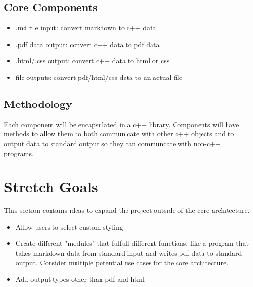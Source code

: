\documentclass[12pt]{article}
\begin{document}
	\subsection{Core Components}
		\begin{itemize}
			\item .md file input: convert markdown to c++ data
			\item .pdf data output: convert c++ data to pdf data
			\item .html/.css output: convert c++ data to html or css
			\item file outputs: convert pdf/html/css data to an actual file
		\end{itemize}
	\subsection{Methodology}
		Each component will be encapsulated in a c++ library. Components will have methods to allow them to both communicate with other c++ objects and to output data to standard output so they can communcate with non-c++ programs.

\section{Stretch Goals}
	This section contains ideas to expand the project outside of the core architecture.
	\begin{itemize}
		\item Allow users to select custom styling
		\item Create different "modules" that fulfull different functions, like a program that takes markdown data from standard input and writes pdf data to standard output. Consider multiple potential use cases for the core architecture.
		\item Add output types other than pdf and html
	\end{itemize}
%
%
%
%
%
%
%
\end{document}
